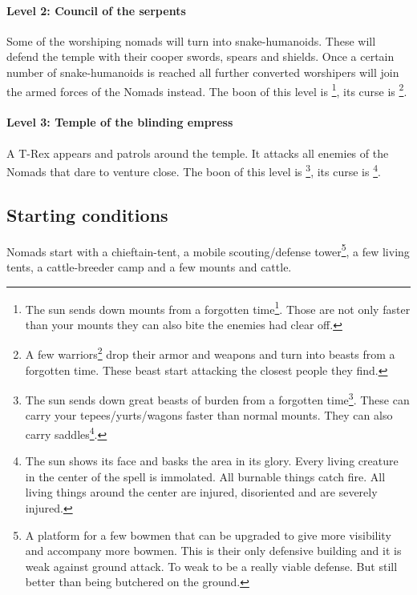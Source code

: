 \documentclass[a4paper]{book}
\begin{document}
			\paragraph{Level 2: Council of the serpents}
				Some of the worshiping nomads will turn into snake-humanoids.
				These will defend the temple with their cooper swords, spears and shields.
				Once a certain number of snake-humanoids is reached all further converted
				worshipers will join the armed forces of the \gls{Nomads} instead.
				The boon of this level is \footnote{
					The sun sends down mounts from a forgotten time\footnote{
						Terror-birds/raptors
					}.
					Those are not only faster than your mounts they can also bite the enemies had clear off.
				},
				its curse is \footnote{
					A few warriors\footnote{
						foreign or domestic, the sun shines on all equally
					} drop their armor and weapons and turn into beasts from a forgotten time.
					These beast start attacking the closest people they find.
				}.

			\paragraph{Level 3: Temple of the blinding empress}
				A T-Rex appears and patrols around the temple.
				It attacks all enemies of the \gls{Nomads} that dare to venture close.
				The boon of this level is \footnote{
					The sun sends down great beasts of burden from a forgotten time\footnote{
						Large herbivore dinosaurs.
					}.
					These can carry your tepees/yurts/wagons faster than normal mounts.
					They can also carry saddles\footnote{
						This is essentially an upgrade that permits production on the move.
					}.
				},
				its curse is \footnote{
					The sun shows its face and basks the area in its glory.
					Every living creature in the center of the spell is immolated.
					All burnable things catch fire.
					All living things around the center are injured, disoriented
					and are severely injured.
				}.

	\subsection{Starting conditions}
		\Gls{Nomads} start with a chieftain-tent, a mobile scouting/defense tower\footnote{
		A platform for a few bowmen that can be upgraded to give more visibility
		and accompany more bowmen.
		This is their only defensive building and it is weak against ground attack.
		To weak to be a really viable defense.
		But still better than being butchered on the ground.
		}, a few living tents, a cattle-breeder camp and a few mounts and cattle.
\end{document}

